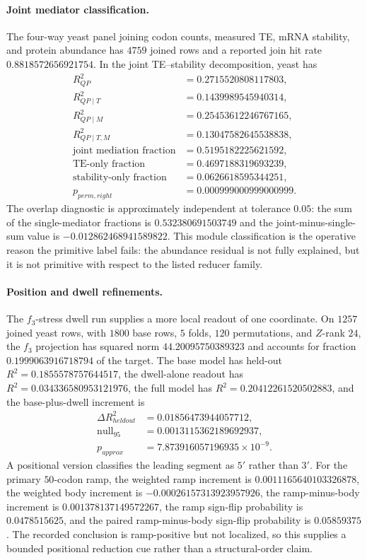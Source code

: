 \paragraph{Joint mediator classification.}
The four-way yeast panel joining codon counts, measured TE, mRNA stability, and protein abundance has $4759$ joined rows and a reported join hit rate $0.8818572656921754$.  In the joint TE--stability decomposition, yeast has
$$
\begin{aligned}
R^2_{QP} &= 0.2715520808117803,\\
R^2_{QP\mid T} &= 0.1439989545940314,\\
R^2_{QP\mid M} &= 0.25453612246767165,\\
R^2_{QP\mid T,M} &= 0.13047582645538838,\\
\text{joint mediation fraction} &= 0.5195182225621592,\\
\text{TE-only fraction} &= 0.4697188319693239,\\
\text{stability-only fraction} &= 0.0626618595344251,\\
p_{perm,right} &= 0.000999000999000999.
\end{aligned}
$$
The overlap diagnostic is approximately independent at tolerance $0.05$: the sum of the single-mediator fractions is $0.532380691503749$ and the joint-minus-single-sum value is $-0.012862468941589822$.  This module classification is the operative reason the primitive label fails: the abundance residual is not fully explained, but it is not primitive with respect to the listed reducer family.

\paragraph{Position and dwell refinements.}
The $f_3$-stress dwell run supplies a more local readout of one coordinate.  On $1257$ joined yeast rows, with $1800$ base rows, $5$ folds, $120$ permutations, and $Z$-rank $24$, the $f_3$ projection has squared norm $44.20095750389323$ and accounts for fraction $0.1999063916718794$ of the target.  The base model has held-out $R^2=0.1855578757644517$, the dwell-alone readout has $R^2=0.034336580953121976$, the full model has $R^2=0.20412261520502883$, and the base-plus-dwell increment is
$$
\begin{aligned}
\Delta R^2_{heldout} &= 0.01856473944057712,\\
\text{null}_{95} &= 0.0013115362189692937,\\
p_{approx} &= 7.873916057196935\times 10^{-9}.
\end{aligned}
$$
A positional version classifies the leading segment as $5'$ rather than $3'$.  For the primary $50$-codon ramp, the weighted ramp increment is $0.0011165640103326878$, the weighted body increment is $-0.00026157313923957926$, the ramp-minus-body increment is $0.001378137149572267$, the ramp sign-flip probability is $0.0478515625$, and the paired ramp-minus-body sign-flip probability is $0.05859375$.  The recorded conclusion is ramp-positive but not localized, so this supplies a bounded positional reduction cue rather than a structural-order claim.

